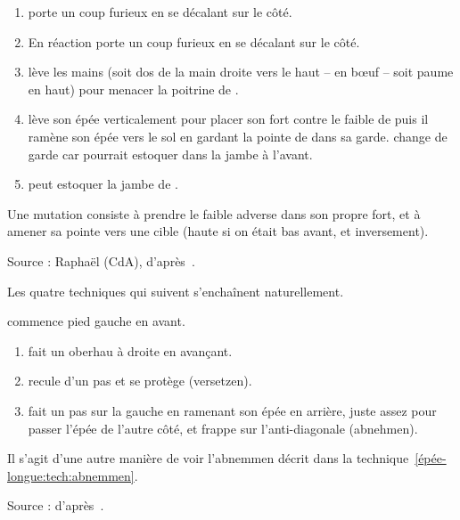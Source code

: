 \begin{technique}[Mutation]

\begin{enumerate}
	\item \A porte un coup furieux en se décalant sur le côté.
	
	\item En réaction \D porte un coup furieux en se décalant sur le côté.
	
	\item \D lève les mains (soit dos de la main droite vers le haut – en bœuf – soit paume en haut) pour menacer la poitrine de \A.
	
	\item \A lève son épée verticalement pour placer son fort contre le faible de \D puis il ramène son épée vers le sol en gardant la pointe de \D dans sa garde. \A change de garde car \D pourrait estoquer dans la jambe à l'avant.
	
	\item \A peut estoquer la jambe de \D.
\end{enumerate}

Une mutation consiste à prendre le faible adverse dans son propre fort, et à amener sa pointe vers une cible (haute si on était bas avant, et inversement).

Source : Raphaël (CdA), d'après~\cite[fol.~23v-24v, §3, p.~23]{farrell:ringeck}.
\end{technique}


Les quatre techniques qui suivent s'enchaînent naturellement.

\begin{technique}
\label{épée-longue:tech:dg-zufechten-abnemmen}

\A commence pied gauche en avant.

\begin{enumerate}
	\item \A fait un oberhau à droite en avançant.
	\item \D recule d'un pas et se protège (versetzen).
	\item \A fait un pas sur la gauche en ramenant son épée en arrière, juste assez pour passer l'épée de l'autre côté, et frappe sur l'anti-diagonale (abnehmen).
\end{enumerate}

Il s'agit d'une autre manière de voir l'abnemmen décrit dans la technique~\ref{épée-longue:tech:abnemmen}.

Source : d'après~\cite{kronenburg:dijon:going_distance:2015}.

\end{technique}



